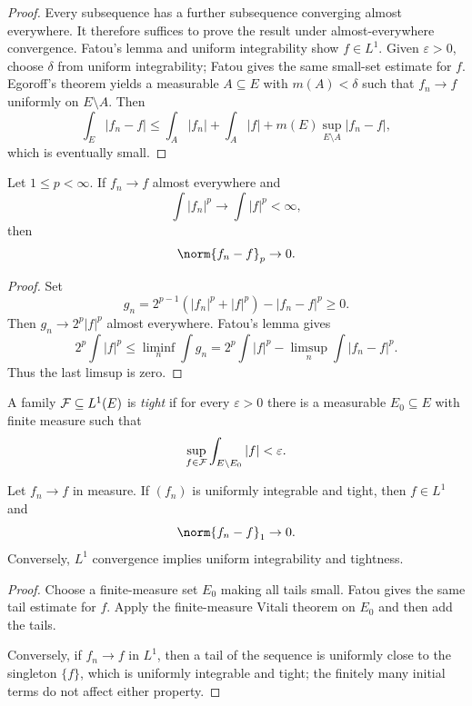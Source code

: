 \begin{proof}
Every subsequence has a further subsequence converging almost everywhere. It therefore suffices to prove the result under almost-everywhere convergence. Fatou's lemma and uniform integrability show $f\in L^1$. Given $\varepsilon>0$, choose $\delta$ from uniform integrability; Fatou gives the same small-set estimate for $f$. Egoroff's theorem yields a measurable $A\subseteq E$ with $m(A)<\delta$ such that $f_n\to f$ uniformly on $E\setminus A$. Then
\[
\int_E|f_n-f|
\leq\int_A|f_n|+\int_A|f|+
 m(E)\sup_{E\setminus A}|f_n-f|,
\]
which is eventually small.
\end{proof}

\begin{cor}
Let $1\leq p<\infty$. If $f_n\to f$ almost everywhere and
\[
\int|f_n|^p\to\int|f|^p<\infty,
\]
then
\[
\norm{f_n-f}_p\to0.
\]
\end{cor}

\begin{proof}
Set
\[
g_n=2^{p-1}(|f_n|^p+|f|^p)-|f_n-f|^p\geq0.
\]
Then $g_n\to2^p|f|^p$ almost everywhere. Fatou's lemma gives
\[
2^p\int|f|^p
\leq\liminf_n\int g_n
=2^p\int|f|^p-
\limsup_n\int|f_n-f|^p.
\]
Thus the last limsup is zero.
\end{proof}

\begin{de}[Tightness]
A family $\mathcal{F}\subseteq L^1(E)$ is \emph{tight} if for every $\varepsilon>0$ there is a measurable $E_0\subseteq E$ with finite measure such that
\[
\sup_{f\in\mathcal{F}}\int_{E\setminus E_0}|f|<\varepsilon.
\]
\end{de}

\begin{thm}
Let $f_n\to f$ in measure. If $(f_n)$ is uniformly integrable and tight, then $f\in L^1$ and
\[
\norm{f_n-f}_1\to0.
\]
Conversely, $L^1$ convergence implies uniform integrability and tightness.
\end{thm}

\begin{proof}
Choose a finite-measure set $E_0$ making all tails small. Fatou gives the same tail estimate for $f$. Apply the finite-measure Vitali theorem on $E_0$ and then add the tails.

Conversely, if $f_n\to f$ in $L^1$, then a tail of the sequence is uniformly close to the singleton $\{f\}$, which is uniformly integrable and tight; the finitely many initial terms do not affect either property.
\end{proof}

